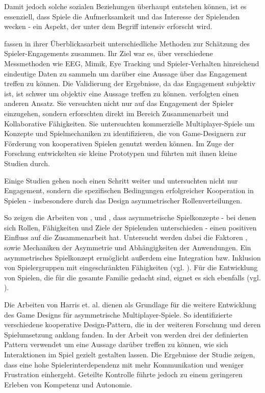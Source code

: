 Damit jedoch solche sozialen Beziehungen überhaupt entstehen können, ist es essenziell, dass Spiele die Aufmerksamkeit und das Interesse der Spielenden wecken - ein Aspekt, der unter dem Begriff  intensiv erforscht wird.

\cite{rashed_review_2025} fassen in ihrer Überblickasarbeit unterschiedliche Methoden zur Schätzung des Spieler-Engagements zusammen. Ihr Ziel war es, über verschiedene Messmethoden wie EEG, Mimik, Eye Tracking und Spieler-Verhalten hinreichend eindeutige Daten zu sammeln um darüber eine Aussage über das Engagement treffen zu können. Die Validierung der Ergebnisse, da das Engagement subjektiv ist, ist schwer um objektiv eine  Aussage treffen zu können.  \cite{yu_video_2023} verfolgten einen anderen Ansatz. Sie versuchten nicht nur auf das Engagement der Spieler einzugehen, sondern erforschten direkt im Bereich Zusammenarbeit und Kollaborative Fähigkeiten. Sie untersuchten kommerzielle Multiplayer-Spiele um Konzepte und Spielmechaniken zu identifizieren, die von Game-Designern zur Förderung von kooperativen Spielen genutzt werden können. Im Zuge der Forschung entwickelten sie kleine Prototypen und führten mit ihnen kleine Studien durch. 

Einige Studien gehen noch einen Schritt weiter und untersuchten nicht nur Engagement, sondern die spezifischen Bedingungen erfolgreicher Kooperation in Spielen - insbesondere durch das Design asymmetrischer Rollenverteilungen.

So zeigen die Arbeiten von \cite{harris_beam_2014}, \cite{harris_leveraging_2016} und \cite{harris_asymmetry_2019}, dass asymmetrische Spielkonzepte - bei denen sich Rollen, Fähigkeiten und Ziele der Spielenden unterschieden - einen positiven Einfluss auf die Zusammenarbeit hat. Untersucht werden dabei die Faktoren ,  sowie Mechaniken der Asymmetrie und Abhängigkeiten der Anwendungen. Ein asymmetrisches Spielkonzept ermöglicht außerdem eine Integration bzw. Inklusion von Spielergruppen mit eingeschränkten Fähigkeiten (vgl. \cite{goncalves_exploring_2021}). Für die Entwicklung von Spielen, die für die gesamte Familie gedacht sind, eignet es sich ebenfalls (vgl. \cite{pais_promoting_2024}).

Die Arbeiten von Harris et. al. dienen als Grundlage für die weitere Entwicklung des Game Designs für asymmetrische Multiplayer-Spiele. So identifizierte \cite{guimaraes_rocha_game_2008} verschiedene kooperative Design-Pattern, die in der weiteren Forschung und deren Spielumsetzung anklang fanden. In der Arbeit von \cite{emmerich_impact_2017} werden drei der definierten Pattern verwendet um eine Aussage darüber treffen zu können, wie sich Interaktionen im Spiel gezielt gestalten lassen. Die Ergebnisse der Studie zeigen, dass eine hohe Spielerinterdependenz mit mehr Kommunikation und weniger Frustration einhergeht. Geteilte Kontrolle führte jedoch zu einem geringeren Erleben von Kompetenz und Autonomie.

